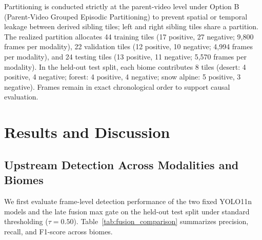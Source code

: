 \documentclass[conference]{IEEEtran}
\begin{document}
Partitioning is conducted strictly at the parent-video level under Option B (Parent-Video Grouped Episodic Partitioning) to prevent spatial or temporal leakage between derived sibling tiles; left and right sibling tiles share a partition. The realized partition allocates 44 training tiles (17 positive, 27 negative; 9,800 frames per modality), 22 validation tiles (12 positive, 10 negative; 4,994 frames per modality), and 24 testing tiles (13 positive, 11 negative; 5,570 frames per modality). In the held-out test split, each biome contributes 8 tiles (desert: 4 positive, 4 negative; forest: 4 positive, 4 negative; snow alpine: 5 positive, 3 negative). Frames remain in exact chronological order to support causal evaluation.

\section{Results and Discussion}

\subsection{Upstream Detection Across Modalities and Biomes}
We first evaluate frame-level detection performance of the two fixed YOLO11n models and the late fusion max gate on the held-out test split under standard thresholding ($\tau = 0.50$). Table~\ref{tab:fusion_comparison} summarizes precision, recall, and F1-score across biomes.
\end{document}
